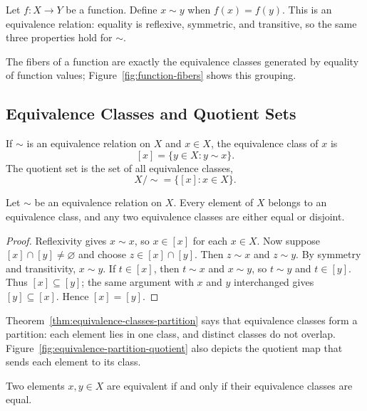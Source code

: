 \begin{example}
Let $f:X\to Y$ be a function. Define $x\sim y$ when $f(x)=f(y)$. This is an equivalence relation: equality is reflexive, symmetric, and transitive, so the same three properties hold for $\sim$.
\end{example}

The fibers of a function are exactly the equivalence classes generated by equality of function values; Figure~\ref{fig:function-fibers} shows this grouping.


\subsection{Equivalence Classes and Quotient Sets}

\begin{definition}
If $\sim$ is an equivalence relation on $X$ and $x\in X$, the equivalence class of $x$ is
\[
 [x]=\{y\in X:y\sim x\}.
\]
The quotient set is the set of all equivalence classes,
\[
 X/{\sim}=\{[x]:x\in X\}.
\]
\end{definition}

\begin{theorem}
\label{thm:equivalence-classes-partition}
Let $\sim$ be an equivalence relation on $X$. Every element of $X$ belongs to an equivalence class, and any two equivalence classes are either equal or disjoint.
\end{theorem}

\begin{proof}
Reflexivity gives $x\sim x$, so $x\in[x]$ for each $x\in X$. Now suppose $[x]\cap[y]\ne\varnothing$ and choose $z\in[x]\cap[y]$. Then $z\sim x$ and $z\sim y$. By symmetry and transitivity, $x\sim y$. If $t\in[x]$, then $t\sim x$ and $x\sim y$, so $t\sim y$ and $t\in[y]$. Thus $[x]\subseteq[y]$; the same argument with $x$ and $y$ interchanged gives $[y]\subseteq[x]$. Hence $[x]=[y]$.
\end{proof}

Theorem~\ref{thm:equivalence-classes-partition} says that equivalence classes form a partition: each element lies in one class, and distinct classes do not overlap. Figure~\ref{fig:equivalence-partition-quotient} also depicts the quotient map that sends each element to its class.


\begin{corollary}
Two elements $x,y\in X$ are equivalent if and only if their equivalence classes are equal.
\end{corollary}

